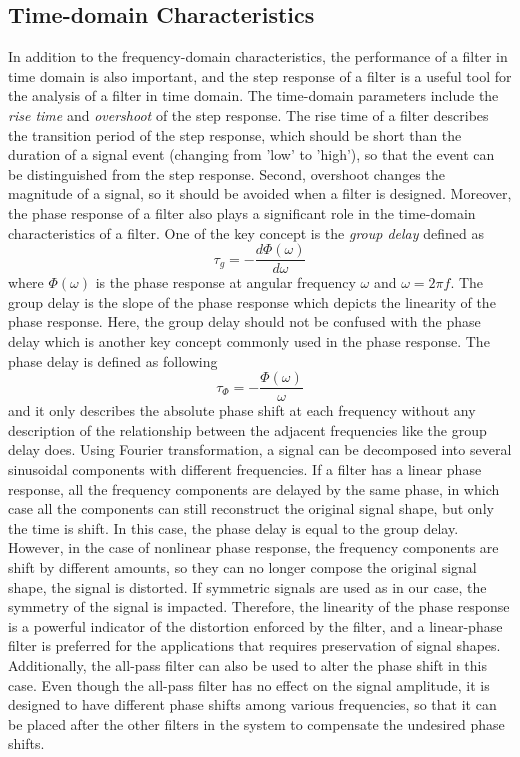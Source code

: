 \subsection{Time-domain Characteristics}
In addition to the frequency-domain characteristics, the performance of a filter in time domain is also important, and the step response of a filter is a useful tool for the analysis of a filter in time domain. The time-domain parameters include the \emph{rise time} and \emph{overshoot} of the step response. The rise time of a filter describes the transition period of the step response, which should be short than the duration of a signal event (\eg changing from 'low' to 'high'), so that the event can be distinguished from the step response. Second, overshoot changes the magnitude of a signal, so it should be avoided when a filter is designed. Moreover, the phase response of a filter also plays a significant role in the time-domain characteristics of a filter. One of the key concept is the \emph{group delay} defined as
\begin{equation}\label{eq:backgrnd_AFE_groupDelay}
    \tau_g= -\frac{d\Phi(\omega)}{d\omega}
\end{equation}
where $\Phi(\omega)$ is the phase response at angular frequency $\omega$ and $\omega = 2\pi f$. The group delay is the slope of the phase response which depicts the linearity of the phase response. Here, the group delay should not be confused with the phase delay which is another key concept commonly used in the phase response. The phase delay is defined as following
\begin{equation}\label{eq:backgrnd_AFE_phaseDelay}
	\tau_{\Phi}= -\frac{\Phi(\omega)}{\omega}
\end{equation}
and it only describes the absolute phase shift at each frequency without any description of the relationship between the adjacent frequencies like the group delay does. Using Fourier transformation, a signal can be decomposed into several sinusoidal components with different frequencies. If a filter has a linear phase response, all the frequency components are delayed by the same phase, in which case all the components can still reconstruct the original signal shape, but only the time is shift. In this case, the phase delay is equal to the group delay. However, in the case of nonlinear phase response, the frequency components are shift by different amounts, so they can no longer compose the original signal shape, \ie the signal is distorted. If symmetric signals are used as in our case, the symmetry of the signal is impacted. Therefore, the linearity of the phase response is a powerful indicator of the distortion enforced by the filter, and a linear-phase filter is preferred for the applications that requires preservation of signal shapes. Additionally, the all-pass filter can also be used to alter the phase shift in this case. Even though the all-pass filter has no effect on the signal amplitude, it is designed to have different phase shifts among various frequencies, so that it can be placed after the other filters in the system to compensate the undesired phase shifts.\par
